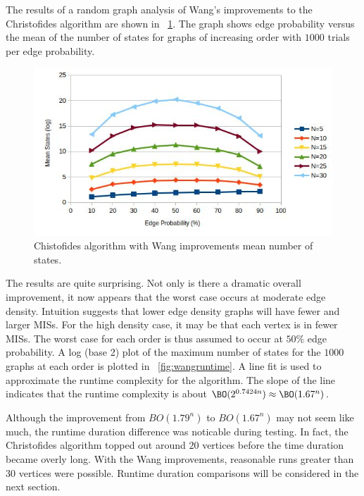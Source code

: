 The results of a random graph analysis of Wang's improvements to the Christofides algorithm are shown in
\figurename~\ref{fig:wangstates}.  The graph shows edge probability versus the mean of the number of states for
graphs of increasing order with \(1000\) trials per edge probability.

\begin{figure}[H]
  \centering
  \includegraphics[width=5in]{wang_states}
  \caption{Chistofides algorithm with Wang improvements mean number of states.}
  \label{fig:wangstates}
\end{figure}

The results are quite surprising.  Not only is there a dramatic overall improvement, it now appears that the worst
case occurs at moderate edge density.  Intuition suggests that lower edge density graphs will have fewer and larger
MISs.  For the high density case, it may be that each vertex is in fewer MISs.  The worst case for each order is
thus assumed to occur at \(50\%\) edge probability.  A log (base 2) plot of the maximum number of states for the
\(1000\) graphs at each order is plotted in \figurename~\ref{fig:wangruntime}.  A line fit is used to approximate
the runtime complexity for the algorithm.  The slope of the line indicates that the runtime complexity is about
\(\BO(2^{0.7424n})\approx\BO(1.67^n)\).

Although the improvement from \(BO(1.79^n)\) to \(BO(1.67^n)\) may not seem like much, the runtime duration
difference was noticable during testing.  In fact, the Christofides algorithm topped out around \(20\) vertices
before the time duration became overly long.  With the Wang improvements, reasonable runs greater than \(30\)
vertices were possible.  Runtime duration comparisons will be considered in the next section.

